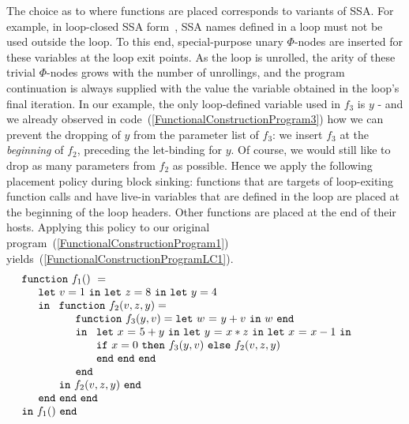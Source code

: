 The choice as to where functions are placed corresponds to variants of
SSA. For example, in loop-closed SSA
form~\cite{Chapter14GraphsAndGating,Chapter19LoopTree}, SSA names
defined in a loop must not be used outside the loop. To this end,
special-purpose unary $\Phi$-nodes are inserted for these variables at
the loop exit points. As the loop is unrolled, the arity of these
trivial $\Phi$-nodes grows with the number of unrollings, and the
program continuation is always supplied with the value the variable
obtained in the loop's final iteration.  In our example, the only
loop-defined variable used in $f_3$ is $y$ - and we already observed
in code~(\ref{FunctionalConstructionProgram3}) how we can prevent the
dropping of $y$ from the parameter list of $f_3$: we insert $f_3$ at
the \emph{beginning} of $f_2$, preceding the let-binding for $y$. Of
course, we would still like to drop as many parameters from $f_2$ as
possible. Hence we apply the following placement policy during block
sinking: functions that are targets of loop-exiting function calls and
have live-in variables that are defined in the loop are placed at the
beginning of the loop headers.  Other functions are placed at the end
of their hosts. Applying this policy to our original
program~(\ref{FunctionalConstructionProgram1})
yields~(\ref{FunctionalConstructionProgramLC1}).
\begin{equation}
\label{FunctionalConstructionProgramLC1}
\begin{array}{l}
\mathtt{function}\ f_1()\ = \\
  \quad
  \begin{array}{l}
     \mathtt{let}\ v = 1 \ 
     \mathtt{in\ let}\ z = 8 \ 
     \mathtt{in\ let}\ y = 4\\
     \mathtt{in}\ 
     \begin{array}[t]{l}
       \mathtt{function}\ f_2(v,z,y) = \\
       \quad \begin{array}{l}  
               \mathtt{function}\ f_3(y,v) = \letin w {y+v} w\\
               \mathtt{in}\
               \begin{array}[t]{l}
                  \letinD x {5+y} {
                  \letinD y {x*z} {
                   \letinD x {x-1} {}}}\\ 
                  \ite {x=0} {\call {f_3} {y,v}}
                     {\call {f_2} {v,z,y}}\\
                  \mathtt{end}\ \mathtt{end}\ \mathtt{end}
               \end{array}\\
               \mathtt{end}
             \end{array}\\
       \mathtt{in}\ f_2(v,z,y)\ \mathtt{end}
     \end{array}\\
     \mathtt{end}\ \mathtt{end}\ \mathtt{end}
  \end{array}\\
  \mathtt{in}\ f_1()\ \mathtt{end}
\end{array}
\end{equation}
